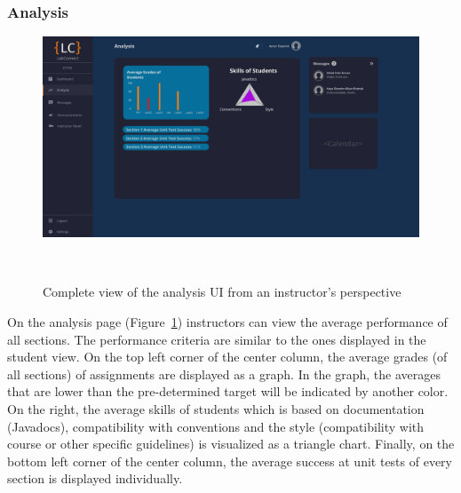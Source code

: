 \documentclass[a4paper, 12pt]{article}
\begin{document}
    
    
    
    
    
    
    
    
    
    
    
    
    \pagebreak
    
    \subsubsection{Analysis}
    
    \begin{figure}[H]
        \centering
        \includegraphics[width=\textwidth]{instructor_analysis}
        \caption{Complete view of the analysis UI from an instructor's perspective}~\label{fig:instructor_analysis_full}
    \end{figure}

    On the analysis page (Figure~\ref{fig:instructor_analysis_full}) instructors can view the average performance of all sections. The performance criteria are similar to the ones displayed in the student view.
    On the top left corner of the center column, the average grades (of all sections) of assignments are displayed as a graph. In the graph, the averages that are lower than the 
    pre-determined target will be indicated by another color. On the right, the average skills of students which is based on documentation (Javadocs), compatibility with 
    conventions and the style (compatibility with course or other specific guidelines) is visualized as a triangle chart. Finally, on the bottom left corner of the center column, the average 
    success at unit tests of every section is displayed individually. 
    
    
    \pagebreak
    
\end{document}
